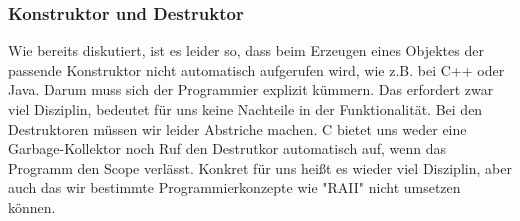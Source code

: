 \subsubsection{Konstruktor und Destruktor}
Wie bereits diskutiert, ist es leider so, dass beim Erzeugen eines Objektes der passende Konstruktor nicht automatisch aufgerufen wird, wie z.B. bei C++ oder Java.
Darum muss sich der Programmier explizit kümmern.
Das erfordert zwar viel Disziplin, bedeutet für uns keine Nachteile in der Funktionalität.
Bei den Destruktoren müssen wir leider Abstriche machen.
C bietet uns weder eine Garbage-Kollektor noch Ruf den Destrutkor automatisch auf, wenn das Programm den Scope verlässt.
Konkret für uns heißt es wieder viel Disziplin, aber auch das wir bestimmte Programmierkonzepte wie "RAII" nicht umsetzen können.

